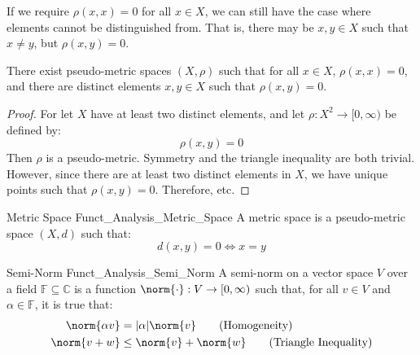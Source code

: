 \documentclass[crop=false,class=book,oneside]{standalone}                      %
\begin{document}
            If we require $\rho(x,x)=0$ for all $x\in{X}$, we
            can still have the case where elements cannot be
            distinguished from. That is, there may be
            $x,y\in{X}$ such that $x\ne{y}$, but
            $\rho(x,y)=0$.
            \begin{theorem}
                There exist pseudo-metric spaces $(X,\rho)$
                such that for all $x\in{X}$, $\rho(x,x)=0$,
                and there are distinct elements $x,y\in{X}$
                such that $\rho(x,y)=0$.
            \end{theorem}
            \begin{proof}
                For let $X$ have at least two distinct elements,
                and let $\rho:X^{2}\rightarrow[0,\infty)$
                be defined by:
                \begin{equation}
                    \rho(x,y)=0
                \end{equation}
                Then $\rho$ is a pseudo-metric. Symmetry and
                the triangle inequality are both trivial.
                However, since there are at least two distinct
                elements in $X$, we have unique points such that
                $\rho(x,y)=0$. Therefore, etc.
            \end{proof}
            \begin{ldefinition}{Metric Space}
                  {Funct_Analysis_Metric_Space}
                A metric space is a pseudo-metric space $(X,d)$
                such that:
                \begin{equation}
                    d(x,y)=0\Longleftrightarrow{x}=y
                    \tag{Definiteness}
                \end{equation}
            \end{ldefinition}
            \begin{ldefinition}{Semi-Norm}
                  {Funct_Analysis_Semi_Norm}
                A semi-norm on a vector space $V$ over a field
                $\mathbb{F}\subseteq\mathbb{C}$ is a function
                $\norm{\cdot}:V\rightarrow[0,\infty)$ such that, for
                all $v\in{V}$ and $\alpha\in\mathbb{F}$,
                it is true that:
                \begin{align}
                    \norm{\alpha{v}}
                    &=|\alpha|\norm{v}
                    \tag{Homogeneity}\\
                    \norm{v+w}
                    &\leq\norm{v}+\norm{w}
                    \tag{Triangle Inequality}
                \end{align}
            \end{ldefinition}
\end{document}
